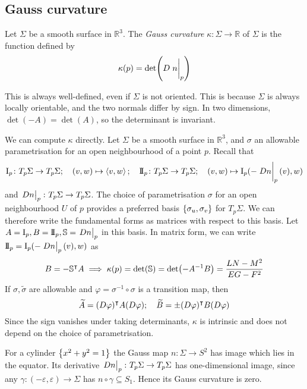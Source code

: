 \subsection{Gauss curvature}
\begin{definition}
	Let \( \Sigma \) be a smooth surface in \( \mathbb R^3 \).
	The \textit{Gauss curvature} \( \kappa \colon \Sigma \to \mathbb R \) of \( \Sigma \) is the function defined by
	\[
		\kappa(p) = \det(D \eval{n}_p)
	\]
\end{definition}
\begin{remark}
	This is always well-defined, even if \( \Sigma \) is not oriented.
	This is because \( \Sigma \) is always locally orientable, and the two normals differ by sign.
	In two dimensions, \( \det(-A) = \det(A) \), so the determinant is invariant.
\end{remark}
We can compute \( \kappa \) directly.
Let \( \Sigma \) be a smooth surface in \( \mathbb R^3 \), and \( \sigma \) an allowable parametrisation for an open neighbourhood of a point \( p \).
Recall that
\[
	\Iff_p \colon T_p \Sigma \to T_p \Sigma;\quad (v,w) \mapsto \inner{v,w};\quad \IIff_p \colon T_p \Sigma \to T_p \Sigma;\quad (v,w) \mapsto \Iff_p(-\eval{Dn}_p(v), w)
\]
and \( \eval{Dn}_p \colon T_p \Sigma \to T_p \Sigma \).
The choice of parametrisation \( \sigma \) for an open neighbourhood \( U \) of \( p \) provides a preferred basis \( \qty{\sigma_u, \sigma_v} \) for \( T_p \Sigma \).
We can therefore write the fundamental forms as matrices with respect to this basis.
Let \( A = \Iff_p, B = \IIff_p, \mathbb S = \eval{Dn}_p \) in this basis.
In matrix form, we can write \( \IIff_p = \Iff_p(-\eval{Dn}_p(v),w) \) as
\[
	B = -\mathbb S^\intercal A \implies \kappa(p) = \det(\mathbb S) = \det(-A^{-1}B) = \frac{LN-M^2}{EG-F^2}
\]
If \( \sigma, \widetilde \sigma \) are allowable and \( \varphi = \sigma^{-1} \circ \sigma \) is a transition map, then
\[
	\widetilde A = (D\varphi)^\intercal A (D \varphi);\quad \widetilde B = \pm (D\varphi)^\intercal B (D \varphi)
\]
Since the sign vanishes under taking determinants, \( \kappa \) is intrinsic and does not depend on the choice of parametrisation.
\begin{example}
	For a cylinder \( \qty{x^2 + y^2 = 1} \) the Gauss map \( n \colon \Sigma \to S^2 \) has image which lies in the equator.
	Its derivative \( \eval{Dn}_p \colon T_p \Sigma \to T_p \Sigma \) has one-dimensional image, since any \( \gamma \colon (-\varepsilon, \varepsilon) \to \Sigma \) has \( n \circ \gamma \subseteq S_1 \).
	Hence its Gauss curvature is zero.
\end{example}
